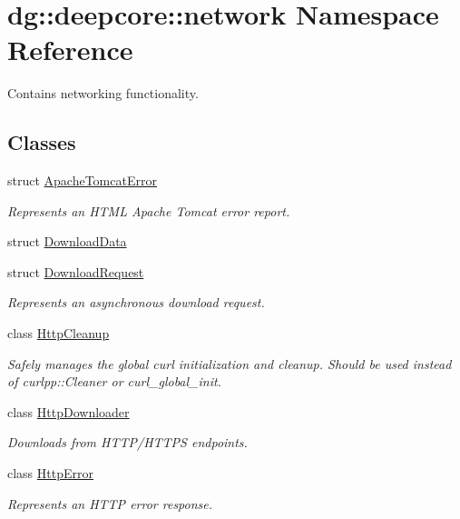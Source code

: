 \hypertarget{namespacedg_1_1deepcore_1_1network}{}\section{dg\+:\+:deepcore\+:\+:network Namespace Reference}
\label{namespacedg_1_1deepcore_1_1network}


Contains networking functionality.  


\subsection*{Classes}
\begin{DoxyCompactItemize}
\item 
struct \hyperlink{structdg_1_1deepcore_1_1network_1_1_apache_tomcat_error}{Apache\+Tomcat\+Error}
\begin{DoxyCompactList}\small\item\em Represents an H\+T\+ML Apache Tomcat error report. \end{DoxyCompactList}\item 
struct \hyperlink{structdg_1_1deepcore_1_1network_1_1_download_data}{Download\+Data}
\item 
struct \hyperlink{structdg_1_1deepcore_1_1network_1_1_download_request}{Download\+Request}
\begin{DoxyCompactList}\small\item\em Represents an asynchronous download request. \end{DoxyCompactList}\item 
class \hyperlink{classdg_1_1deepcore_1_1network_1_1_http_cleanup}{Http\+Cleanup}
\begin{DoxyCompactList}\small\item\em Safely manages the global curl initialization and cleanup. Should be used instead of curlpp\+::\+Cleaner or curl\+\_\+global\+\_\+init. \end{DoxyCompactList}\item 
class \hyperlink{classdg_1_1deepcore_1_1network_1_1_http_downloader}{Http\+Downloader}
\begin{DoxyCompactList}\small\item\em Downloads from H\+T\+T\+P/\+H\+T\+T\+PS endpoints. \end{DoxyCompactList}\item 
class \hyperlink{classdg_1_1deepcore_1_1network_1_1_http_error}{Http\+Error}
\begin{DoxyCompactList}\small\item\em Represents an H\+T\+TP error response. \end{DoxyCompactList}\item 

\end{DoxyCompactItemize}
